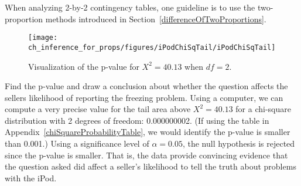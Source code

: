 When analyzing 2-by-2 contingency tables, one guideline
is to use the two-proportion methods introduced in
Section~\ref{differenceOfTwoProportions}.

\D{\newpage}

\begin{figure}[h]
\centering
\texttt{[image: ch\_inference\_for\_props/figures/iPodChiSqTail/iPodChiSqTail]}
\caption{Visualization of the p-value for $X^2 = 40.13$
    when $df = 2$.}
\label{iPodChiSqTail}
\end{figure}

\begin{examplewrap}
\begin{nexample}{Find the p-value and draw a conclusion
    about whether the question affects the sellers likelihood
    of reporting the freezing problem.}
  Using a computer, we can compute a very precise value
  for the tail area above $X^2 = 40.13$ for a chi-square
  distribution with 2 degrees of freedom:
  0.000000002.
  (If using the table in
    Appendix~\ref{chiSquareProbabilityTable},
    we would identify the p-value is smaller
    than 0.001.)
  Using a significance level of $\alpha=0.05$,
  the null hypothesis is rejected since the p-value is smaller.
  That is, the data provide convincing evidence that the
  question asked did affect a seller's likelihood to tell
  the truth about problems with the iPod.
\end{nexample}
\end{examplewrap}



